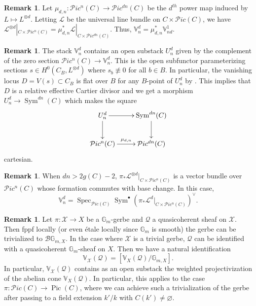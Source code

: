 \documentclass[a4paper,12pt]{amsart}
\theoremstyle{definition}
\newtheorem{rmk}[thm]{Remark}
\newcommand{\bG}{\mathbb{G}}
\newcommand{\bV}{\mathbb{V}}
\newcommand{\cX}{\mathcal{X}}
\newcommand{\cQ}{\mathcal{Q}}
\newcommand{\cL}{\mathcal{L}}
\DeclareMathOperator{\Spec}{Spec}
\DeclareMathOperator{\Pic}{Pic}
\DeclareMathOperator{\Sym}{Sym}
\newcommand{\Ppic}{\mathcal{P}ic}
\begin{document}
	\begin{rmk}\label{rem:d:power} Let $\mu_{d,n} : \Ppic^n(C) \to \Ppic^{dn}(C)$ be the $d^{th}$ power map induced by $L \mapsto L^{\otimes d}$. Letting $\cL$ be the universal line bundle on $C\times\Ppic(C)$, we have $\cL^{\otimes d}|_{C\times\Ppic^n(C)} = \mu_{d,n}^*\cL|_{C\times\Ppic^{dn}(C)}$. Thus, $\bV^d_n = \mu_{d,n}^*\bV^1_{nd}$. 
	\end{rmk}
	
	\begin{rmk}\label{rem:open:sym} The stack $\bV^d_n$ contains an open substack $U^d_n$ given by the complement of the zero section $\Ppic^n(C) \to \bV^d_n$. This is the open subfunctor parameterizing sections $s \in H^0(C_B, L^{\otimes d})$ where $s_b \not \equiv 0$ for all $b \in B$. In particular, the vanishing locus $D = V(s) \subset C_B$ is flat over $B$ for any $B$-point of $U^d_n$ by \cite[\href{https://stacks.math.columbia.edu/tag/00ME}{Tag 00ME}]{Stacks}. This implies that $D$ is a relative effective Cartier divisor and we get a morphism $U^d_n \to \Sym^{dn}(C)$ which makes the square
		\[
		\xymatrix{
			U^d_n\ar[r]\ar[d] & \Sym^{dn}(C)\ar[d]\\
			\Ppic^n(C)\ar[r]^-{\mu_{d,n}} & \Ppic^{dn}(C)
		}
		\]
		cartesian.
		
	\end{rmk}
	
	\begin{rmk}\label{rem:rrbound} When $dn > 2g(C) - 2$, $\pi_*\cL^{\otimes d}|_{C\times\Ppic^n(C)}$ is a vector bundle over $\Ppic^n(C)$ whose formation commutes with base change. In this case, 
		$$
		\bV^d_n = \Spec_{\Ppic(C)} \Sym^\bullet (\pi_*\cL^d|_{C\times\Ppic^n(C)})^\vee.
		$$
	\end{rmk}
	
	\begin{rmk}\label{rem:gerbe:quotient} Let $\pi : \cX \to X$ be a $\mathbb{G}_m$-gerbe and $\cQ$ a quasicoherent sheaf on $\cX$. Then fppf locally (or even \'etale locally since $\bG_m$ is smooth) the gerbe can be trivialized to $\mathcal{B} \bG_{m,X}$. In the case where $\cX$ is a trivial gerbe, $\cQ$ can be identified with a quasicoherent $\bG_m$-sheaf on $X$. Then we have a natural identification
		$$
		\bV_{\cX}(\cQ) = [\bV_{X}(\cQ)/\bG_{m,X}]. 
		$$
		In particular, $\bV_{\cX}(\cQ)$ contains as an open substack the weighted projectivization of the abelian cone $\bV_X(\cQ)$. In particular, this applies to the case $\pi : \Ppic(C) \to \Pic(C)$, where we can achieve such a trivialization of the gerbe after passing to a field extension $k'/k$ with $C(k') \neq \varnothing$. 
	\end{rmk}
	
\end{document}
